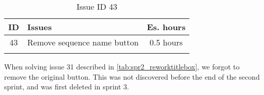 \begin{longtable} { | c | p{12cm} | c | } 
\hline
	ID 	&	Issues	&		 Es. hours \\\hline
	43	&	Remove sequence name button		&	0.5 hours \\\hline
\caption{Issue ID 43}
\label{tab:spr3_removeeditnamebutton}
\end{longtable}

When solving issue 31 described in \ref{tab:spr2_reworktitlebox}, we forgot to remove the original button. This was not discovered before the end of the second sprint, and was first deleted in sprint 3.